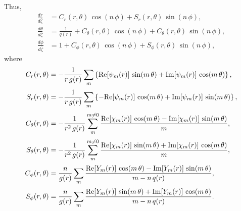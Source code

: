 \documentclass[12pt,prb,aps,notitlepage]{revtex4-1}
\begin{document}
Thus,
\begin{align}
\frac{dr}{d\bar{\zeta}}&= C_r(r,\theta)\,\cos(n\,\phi) + S_r(r,\theta)\,\sin(n\,\phi),\\[0.5ex]
\frac{d\theta}{d\bar{\zeta}}&=\frac{1}{q(r)}+ C_\theta(r,\theta)\,\cos(n\,\phi) + C_\theta(r,\theta)\,\sin(n\,\phi),\\[0.5ex]
\frac{d\phi}{d\bar{\zeta}}&= 1+C_\phi(r,\theta)\,\cos(n\,\phi) + S_\phi(r,\theta)\,\sin(n\,\phi),
\end{align}
where
\begin{align}
C_r(r,\theta)&=-\frac{1}{r\,g(r)}\sum_m\left\{{\rm Re}[\psi_m(r)]\,\sin(m\,\theta) + {\rm Im}[\psi_m(r)]\,\cos(m\,\theta)\right\},\\[0.5ex]
S_r(r,\theta)&=-\frac{1}{r\,g(r)}\sum_m\left\{ -{\rm Re}[\psi_m(r)]\,\cos(m\,\theta) + {\rm Im}[\psi_m(r)]\,\sin(m\,\theta)\right\},\\[0.5ex]
C_\theta(r,\theta)&=-\frac{1}{r^2\,g(r)}\sum_{m}^{m\neq 0}\frac{{\rm Re}[\chi_m(r)]\,\cos(m\,\theta) - {\rm Im}[\chi_m(r)]\,\sin(m\,\theta)}{m},\\[0.5ex]
S_\theta(r,\theta)&=-\frac{1}{r^2\,g(r)}\sum_{m}^{m\neq 0}\frac{{\rm Re}[\chi_m(r)]\,\sin(m\,\theta) + {\rm Im}[\chi_m(r)]\,\cos(m\,\theta)}{m},\\[0.5ex]
C_\phi(r,\theta)&=\frac{n}{g(r)}\sum_{m}\frac{{\rm Re}[Y_m(r)]\,\cos(m\,\theta) - {\rm Im}[Y_m(r)]\,\sin(m\,\theta)}{m-n\,q(r)},\\[0.5ex]
S_\phi(r,\theta)&=\frac{n}{g(r)}\sum_{m}\frac{{\rm Re}[Y_m(r)]\,\sin(m\,\theta) + {\rm Im}[Y_m(r)]\,\cos(m\,\theta)}{m-n\,q(r)}.
\end{align}
\end{document}
